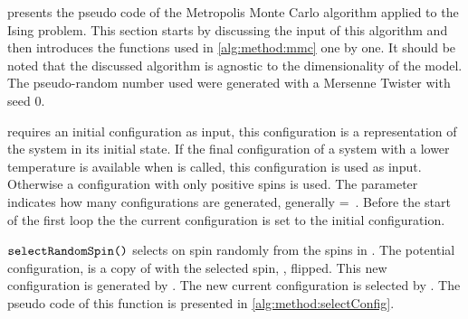  presents the pseudo code of the Metropolis Monte Carlo algorithm applied to the Ising problem. This section starts by discussing the input of this algorithm and then introduces the functions used in \cref{alg:method:mmc} one by one. It should be noted that the discussed algorithm is agnostic to the dimensionality of the model. The pseudo-random number used were generated with a Mersenne Twister with seed 0.



 requires an initial configuration  as input, this configuration is a representation of the system in its initial state. If the final configuration of a system with a lower temperature is available when  is called, this configuration is used as input. Otherwise a configuration with only positive spins is used. The parameter \numberOfIterations indicates how many configurations are generated, generally \mbox{\numberOfIterations = \numberOfSpins}. Before the start of the first loop the the current configuration is set to the initial configuration.

$\FuncSty{selectRandomSpin()}$ selects on spin randomly from the spins in . The potential configuration,  is a copy of  with the selected spin, \spin{}, flipped. This new configuration is generated by . The new current configuration is selected by . The pseudo code of this function is presented in \cref{alg:method:selectConfig}.



